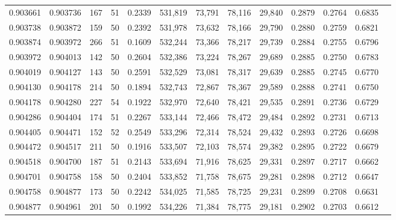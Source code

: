 \begin{tabular}{rrrrrrrrrrrrr}
0.903661 & 0.903736 &   167 &  51 &                                     0.2339 & 531,819 &  73,791 &  78,116 &  29,840 & 0.2879 & 0.2764 & 0.6835 \\
0.903738 & 0.903872 &   159 &  50 &                                     0.2392 & 531,978 &  73,632 &  78,166 &  29,790 & 0.2880 & 0.2759 & 0.6821 \\
0.903874 & 0.903972 &   266 &  51 &                                     0.1609 & 532,244 &  73,366 &  78,217 &  29,739 & 0.2884 & 0.2755 & 0.6796 \\
0.903972 & 0.904013 &   142 &  50 &                                     0.2604 & 532,386 &  73,224 &  78,267 &  29,689 & 0.2885 & 0.2750 & 0.6783 \\
0.904019 & 0.904127 &   143 &  50 &                                     0.2591 & 532,529 &  73,081 &  78,317 &  29,639 & 0.2885 & 0.2745 & 0.6770 \\
0.904130 & 0.904178 &   214 &  50 &                                     0.1894 & 532,743 &  72,867 &  78,367 &  29,589 & 0.2888 & 0.2741 & 0.6750 \\
0.904178 & 0.904280 &   227 &  54 &                                     0.1922 & 532,970 &  72,640 &  78,421 &  29,535 & 0.2891 & 0.2736 & 0.6729 \\
0.904286 & 0.904404 &   174 &  51 &                                     0.2267 & 533,144 &  72,466 &  78,472 &  29,484 & 0.2892 & 0.2731 & 0.6713 \\
0.904405 & 0.904471 &   152 &  52 &                                     0.2549 & 533,296 &  72,314 &  78,524 &  29,432 & 0.2893 & 0.2726 & 0.6698 \\
0.904472 & 0.904517 &   211 &  50 &                                     0.1916 & 533,507 &  72,103 &  78,574 &  29,382 & 0.2895 & 0.2722 & 0.6679 \\
0.904518 & 0.904700 &   187 &  51 &                                     0.2143 & 533,694 &  71,916 &  78,625 &  29,331 & 0.2897 & 0.2717 & 0.6662 \\
0.904701 & 0.904758 &   158 &  50 &                                     0.2404 & 533,852 &  71,758 &  78,675 &  29,281 & 0.2898 & 0.2712 & 0.6647 \\
0.904758 & 0.904877 &   173 &  50 &                                     0.2242 & 534,025 &  71,585 &  78,725 &  29,231 & 0.2899 & 0.2708 & 0.6631 \\
0.904877 & 0.904961 &   201 &  50 &                                     0.1992 & 534,226 &  71,384 &  78,775 &  29,181 & 0.2902 & 0.2703 & 0.6612 \\

\end{tabular}
